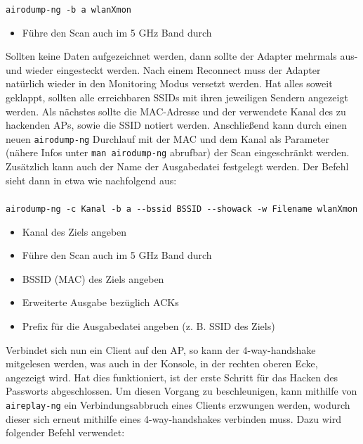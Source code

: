 \begin{enumerate}
	\colorbox{altgray}{\lstinline|airodump-ng -b a wlanXmon|}
	\begin{itemize}
		\item {} Führe den Scan auch im 5 GHz Band durch
	\end{itemize}

	Sollten keine Daten aufgezeichnet werden, dann sollte der Adapter mehrmals aus- und wieder eingesteckt werden. Nach einem Reconnect muss der Adapter natürlich wieder in den Monitoring Modus versetzt werden. Hat alles soweit geklappt, sollten alle erreichbaren SSIDs mit ihren jeweiligen Sendern angezeigt werden. Als nächstes sollte die MAC-Adresse und der verwendete Kanal des zu hackenden APs, sowie die SSID notiert werden. Anschließend kann durch einen neuen \colorbox{altgray}{\lstinline|airodump-ng|} Durchlauf mit der MAC und dem Kanal als Parameter (nähere Infos unter \colorbox{altgray}{\lstinline|man airodump-ng|} abrufbar) der Scan eingeschränkt werden. Zusätzlich kann auch der Name der Ausgabedatei festgelegt werden. Der Befehl sieht dann in etwa wie nachfolgend aus:\\
	\\
	\colorbox{altgray}{\lstinline|airodump-ng -c Kanal -b a --bssid BSSID --showack -w Filename wlanXmon|}
	\begin{itemize}
		\item {} Kanal des Ziels angeben
		\item {} Führe den Scan auch im 5 GHz Band durch
		\item {} BSSID (MAC) des Ziels angeben
		\item {} Erweiterte Ausgabe bezüglich ACKs
		\item {} Prefix für die Ausgabedatei angeben (z. B. SSID des Ziels)
	\end{itemize} 

	Verbindet sich nun ein Client auf den AP, so kann der 4-way-handshake mitgelesen werden, was auch in der Konsole, in der rechten oberen Ecke, angezeigt wird. Hat dies funktioniert, ist der erste Schritt für das Hacken des Passworts abgeschlossen. Um diesen Vorgang zu beschleunigen, kann mithilfe von \colorbox{altgray}{\lstinline|aireplay-ng|} ein Verbindungsabbruch eines Clients erzwungen werden, wodurch dieser sich erneut mithilfe eines 4-way-handshakes verbinden muss. Dazu wird folgender Befehl verwendet:\newline\newline


\end{enumerate}
